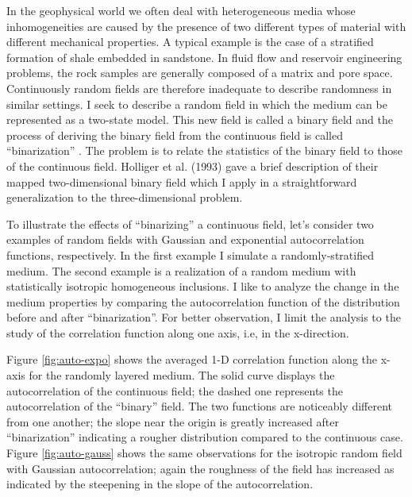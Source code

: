  In the geophysical world we often deal with heterogeneous media 
whose inhomogeneities are caused by the presence of two different 
types of material
with different mechanical properties. A typical example is the case of a
stratified formation of shale embedded in sandstone. In fluid flow and 
reservoir engineering problems, the rock samples are generally composed of 
a matrix and pore space. Continuously random fields are therefore
inadequate to describe randomness in similar settings. I seek to describe 
a random field in which the medium can be represented as a two-state model. 
This new field is called a binary field and the 
process of deriving the binary field from the continuous field is called 
``binarization'' \cite{Holliger2}. The problem is to relate the statistics
of the binary field to those of the continuous field. 
Holliger et al. (1993) gave a brief description of their mapped two-dimensional binary field which I 
apply in a straightforward generalization to the three-dimensional problem.\
\par
To illustrate the effects of ``binarizing'' a continuous field, let's consider two
examples of random fields with Gaussian and exponential autocorrelation 
functions, respectively. In the first example I simulate a randomly-stratified medium. The
second example is a realization of a random medium with statistically 
isotropic homogeneous inclusions. I like to analyze the change in the medium
properties by comparing the autocorrelation function of the distribution
before and after ``binarization''. For better observation, I limit the analysis 
to the study of the correlation function along one axis, 
i.e, in the x-direction.
\par
Figure \ref{fig:auto-expo} shows the averaged 1-D correlation 
function along the x-axis 
for the randomly layered medium. The solid curve displays the autocorrelation
of the continuous field; the dashed one represents the autocorrelation
of the ``binary'' field. The two functions are noticeably different from one 
another; the slope near the origin is greatly increased after ``binarization''
indicating
a rougher distribution compared to the continuous case. Figure \ref{fig:auto-gauss} shows
the same observations for the isotropic random field with Gaussian 
autocorrelation; again the roughness
of the field has increased as indicated by the steepening in the slope of the
autocorrelation.
